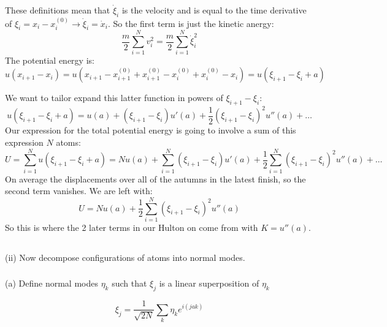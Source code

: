 \documentclass[12pt]{article}
\begin{document}
\subsubsection{}
These definitions mean that $\dot{\xi}_{i}$ is the velocity and is equal to the time derivative of $\xi_{i}=x_{i}-x_{i}^{(0)}\rightarrow \dot{\xi}_{i}=\dot{x}_{i}$. So the first term is just the kinetic anergy:
\begin{equation}
  \frac{m}{2}\sum_{i=1}^{N} v_{i}^{2} = \frac{m}{2}\sum_{i=1}^{N} \dot{\xi}_{i}^{2}
\end{equation}
The potential energy is:
\begin{equation}
  u(x_{i+1}-x_{i}) = u(x_{i+1}-x_{i+1}^{(0)}+x_{i+1}^{(0)}-x_{i}^{(0)}+x_{i}^{(0)}-x_{i}) = u(\xi_{i+1}-\xi_{i}+a)
\end{equation}

We want to tailor expand this latter function in powers of $\xi_{i+1}-\xi_{i}$:
\begin{equation}
  u(\xi_{i+1}-\xi_{i}+a) = u(a) + \left(\xi_{i+1}-\xi_{i}\right)u'(a) + \frac{1}{2}\left(\xi_{i+1}-\xi_{i}\right)^2u''(a) + \ldots
\end{equation}
Our expression for the total potential energy is going to involve a sum of this expression $N$ atoms:
\begin{equation}
  U = \sum_{i=1}^{N} u(\xi_{i+1}-\xi_{i}+a) = Nu(a) + \sum_{i=1}^{N} \left(\xi_{i+1}-\xi_{i}\right)u'(a) + \frac{1}{2}\sum_{i=1}^{N}\left(\xi_{i+1}-\xi_{i}\right)^2u''(a) + \ldots
\end{equation}
On average the displacements over all of the autumns in the latest finish, so the second term vanishes. We are left with:
\begin{equation}
  U = Nu(a) + \frac{1}{2}\sum_{i=1}^{N}\left(\xi_{i+1}-\xi_{i}\right)^2u''(a)
\end{equation}
So this is where the 2 later terms in our Hulton on come from with $K=u''(a)$.
\subsection{}
(ii) Now decompose configurations of atoms into normal modes.
\subsubsection{}
(a) Define normal modes $\eta_{k}$ such that $\xi_{j}$ is a linear superposition of $\eta_{k}$

\begin{equation*}
\xi_{j}=\frac{1}{\sqrt{2 N}} \sum_{k} \eta_{k} e^{i(j a k)} \tag{7}
\end{equation*}
\end{document}
